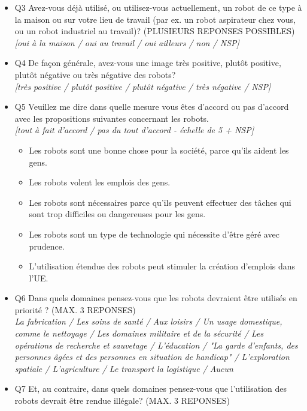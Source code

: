 \strut

\begin{itemize}
  \item Q3 Avez-vous déjà utilisé, ou utilisez-vous actuellement, un robot de ce type à la maison ou sur votre lieu de travail (par ex. un robot aspirateur chez vous, ou un robot industriel au travail)? (PLUSIEURS REPONSES POSSIBLES)\\
  \textit{[oui à la maison / oui au travail / oui ailleurs / non / NSP]}\\
  \item Q4 De façon générale, avez-vous une image très positive, plutôt positive, plutôt négative ou très négative des robots?\\
  \textit{[très positive / plutôt positive / plutôt négative / très négative / NSP]}\\
  \item Q5 Veuillez me dire dans quelle mesure vous êtes d’accord ou pas d’accord avec les propositions suivantes concernant les robots.\\
  \textit{[tout à fait d'accord / pas du tout d'accord - échelle de 5 + NSP]}
    \begin{itemize}
    \item Les robots sont une bonne chose pour la société, parce qu’ils aident les gens.
    \item Les robots volent les emplois des gens.
    \item Les robots sont nécessaires parce qu’ils peuvent effectuer des tâches qui sont trop difficiles ou dangereuses pour les gens.
    \item Les robots sont un type de technologie qui nécessite d’être géré avec prudence.
    \item L’utilisation étendue des robots peut stimuler la création d’emplois dans l’UE.\\
    \end{itemize}
  \item Q6 Dans quels domaines pensez-vous que les robots devraient être utilisés en priorité ? (MAX. 3 REPONSES)\\
  \textit{La fabrication / Les soins de santé / Aux loisirs / Un usage domestique, comme le nettoyage / Les domaines militaire et de la sécurité / Les opérations de recherche et sauvetage / L’éducation / "La garde d’enfants, des personnes âgées et des personnes en situation de handicap" / L’exploration spatiale / L’agriculture / Le transport la logistique / Aucun}\\
  \item Q7 Et, au contraire, dans quels domaines pensez-vous que l’utilisation des robots devrait être rendue illégale? (MAX. 3 REPONSES)\\

\end{itemize}
